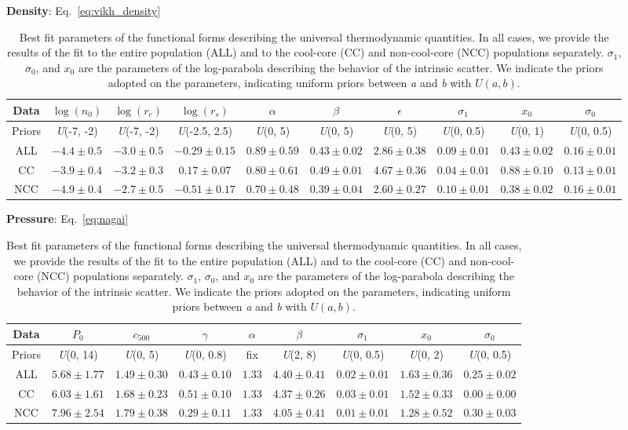 \documentclass[traditabstract   ]{aa} %
\begin{document}
\begin{table}
\caption{\label{tab:forms}Best fit parameters of the functional forms describing the universal thermodynamic quantities. In all cases, we provide the results of the fit to the entire population (ALL) and to the  cool-core (CC) and non-cool-core (NCC) populations separately.  $\sigma_1$, $\sigma_0$, and $x_0$ are the parameters of the log-parabola describing the behavior of the intrinsic scatter.
We indicate the priors adopted on the parameters, indicating uniform priors between \emph{a} and \emph{b} with $U(a, b)$.
}

\begin{center}

{\bf Density}: Eq.~\eqref{eq:vikh_density}

\begin{tabular}{ c | c c c c c c | c c c }
Data & $\log(n_0)$ & $\log(r_c)$ &  $\log(r_s)$ & $\alpha$ & $\beta$ & $\epsilon$ & $\sigma_1$ & $x_0$ & $\sigma_0$ \\ 
\hline
Priors & \emph{U}(-7, -2) & \emph{U}(-7, -2) & \emph{U}(-2.5, 2.5) & \emph{U}(0, 5)  & \emph{U}(0, 5) & \emph{U}(0, 5) & \emph{U}(0, 0.5) & \emph{U}(0, 1) & \emph{U}(0, 0.5) \\

ALL & $-4.4 \pm 0.5$ &$-3.0 \pm 0.5$ &$-0.29 \pm 0.15$ &$0.89 \pm 0.59$ &$0.43 \pm 0.02$ &$2.86 \pm 0.38$ &$0.09 \pm 0.01$ &$0.43 \pm 0.02$ &$0.16 \pm 0.01$ \\
CC & $-3.9 \pm 0.4$ &$-3.2 \pm 0.3$ &$0.17 \pm 0.07$ &$0.80 \pm 0.61$ &$0.49 \pm 0.01$ &$4.67 \pm 0.36$ &$0.04 \pm 0.01$ &$0.88 \pm 0.10$ &$0.13 \pm 0.01$ \\
NCC & $-4.9 \pm 0.4$ &$-2.7 \pm 0.5$ &$-0.51 \pm 0.17$ &$0.70 \pm 0.48$ &$0.39 \pm 0.04$ &$2.60 \pm 0.27$ &$0.10 \pm 0.01$ &$0.38 \pm 0.02$ &$0.16 \pm 0.01$ \\
\end{tabular}

{\bf Pressure}: Eq.~\eqref{eq:nagai}

\begin{tabular}{ c | c c c c c | c c c }
Data & $P_0$ & $c_{500}$ &  $\gamma$ & $\alpha$ & $\beta$ & $\sigma_1$ & $x_0$ & $\sigma_0$ \\ 
\hline
Priors & \emph{U}(0, 14) & \emph{U}(0, 5) & \emph{U}(0, 0.8) & fix & \emph{U}(2, 8) & \emph{U}(0, 0.5) & \emph{U}(0, 2) & \emph{U}(0, 0.5) \\

ALL & $5.68 \pm 1.77$ & $1.49 \pm 0.30$ & $0.43 \pm 0.10$ & $1.33$ & $4.40 \pm 0.41$ & $0.02 \pm 0.01$ & $1.63 \pm 0.36$ & $0.25 \pm 0.02$ \\
CC & $6.03 \pm 1.61$ & $1.68 \pm 0.23$ & $0.51 \pm 0.10$ & $1.33$ & $4.37 \pm 0.26$ & $0.03 \pm 0.01$ & $1.52 \pm 0.33$ & $0.00 \pm 0.00$ \\
NCC & $7.96 \pm 2.54$ & $1.79 \pm 0.38$ & $0.29 \pm 0.11$ & $1.33$ & $4.05 \pm 0.41$ & $0.01 \pm 0.01$ & $1.28 \pm 0.52$ & $0.30 \pm 0.03$ \\
\end{tabular}


\end{center}
\end{table}
\end{document}
